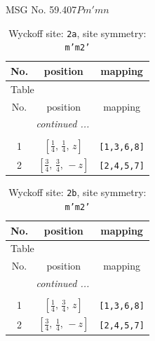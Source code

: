 \documentclass[fleqn,8pt]{jsarticle}
\begin{document}
\setcounter{MaxMatrixCols}{32}

\renewcommand{\tablename}{Table~}
\renewcommand{\figurename}{Figure~}
\begin{center}
\LARGE
MSG No. 59.407\quad$Pm'mn$
\end{center}
\renewcommand{\arraystretch}{1.2}
\begin{longtable}{ccc}
\caption{Wyckoff site: {\tt 2a}, site symmetry: {\tt m'm2'}}
 \\
 \hline \hline
No. & position & mapping \\ \hline \endfirsthead

\multicolumn{2}{l}{\tablename\ \thetable{}} \\
 \hline \hline
No. & position & mapping \\ \hline \endhead

 \hline \hline
\multicolumn{2}{r}{\footnotesize\it continued ...} \\ \endfoot

 \hline \hline
\multicolumn{2}{r}{} \\ \endlastfoot

1 & $\left[ \frac{1}{4},\, \frac{1}{4},\, z \right]$ & {\tt [1,3,6,8]} \\ \hline
2 & $\left[ \frac{3}{4},\, \frac{3}{4},\, - z \right]$ & {\tt [2,4,5,7]} \\
\end{longtable}
\renewcommand{\arraystretch}{1.2}
\begin{longtable}{ccc}
\caption{Wyckoff site: {\tt 2b}, site symmetry: {\tt m'm2'}}
 \\
 \hline \hline
No. & position & mapping \\ \hline \endfirsthead

\multicolumn{2}{l}{\tablename\ \thetable{}} \\
 \hline \hline
No. & position & mapping \\ \hline \endhead

 \hline \hline
\multicolumn{2}{r}{\footnotesize\it continued ...} \\ \endfoot

 \hline \hline
\multicolumn{2}{r}{} \\ \endlastfoot

1 & $\left[ \frac{1}{4},\, \frac{3}{4},\, z \right]$ & {\tt [1,3,6,8]} \\ \hline
2 & $\left[ \frac{3}{4},\, \frac{1}{4},\, - z \right]$ & {\tt [2,4,5,7]} \\
\end{longtable}
\end{document}
